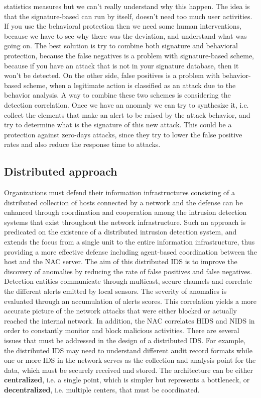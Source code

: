 \documentclass[11pt]{article}
\begin{document}
statistics measures but we can't really understand why this happen. The idea is that the signature-based can run by itself, doesn't need too much user activities. If you use the behavioral protection then we need some human interventions, because we have to see why there was the deviation, and understand what was going on. The best solution is try to combine both signature and behavioral protection, because the false negatives is a problem with signature-based scheme, because if you have an attack that is not in your signature database, then it won't be detected. On the other side, false positives is a problem with behavior-based scheme, when a legitimate action is classified as an attack due to the behavior analysis. A way to combine these two schemes is considering the detection correlation. Once we have an anomaly we can try to synthesize it, i.e. collect the elements that make an alert to be raised by the attack behavior, and try to determine what is the signature of this new attack. This could be a protection against zero-days attacks, since they try to lower the false positive rates and also reduce the response time to attacks.
\subsection{Distributed approach}
Organizations must defend their information infrastructures consisting of a distributed collection of hosts connected by a network and the defense can be enhanced through coordination and cooperation among the intrusion detection systems that exist throughout the network infrastructure. Such an approach is predicated on the existence of a distributed intrusion detection system, and extends the focus from a single unit to the entire information infrastructure, thus providing a more effective defense including agent-based coordination between the host and the NAC server. The aim of this distributed IDS is to improve the discovery of anomalies by reducing the rate of false positives and false negatives. Detection entities communicate through multicast, secure channels and correlate the different alerts emitted by local sensors. The severity of anomalies is evaluated through an accumulation of alerts scores. This correlation yields a more accurate picture of the network attacks that were either blocked or actually reached the internal network. In addition, the NAC correlates HIDS and NIDS in order to constantly monitor and block malicious activities. There are several issues that must be addressed in the design of a distributed IDS. For example, the distributed IDS may need to understand different audit record formats while one or more IDS in the network serves as the collection and analysis point for the data, which must be securely received and stored. The architecture can be either \textbf{centralized}, i.e. a single point, which is simpler but represents a bottleneck, or \textbf{decentralized}, i.e. multiple centers, that must be coordinated.
\end{document}
